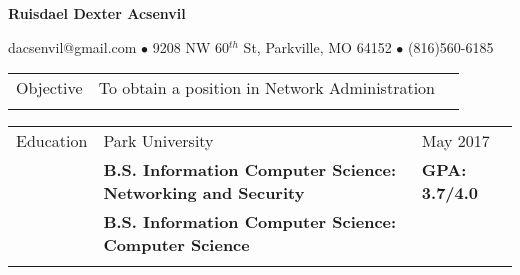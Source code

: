 \documentclass[12pt, arial]{article}
\begin{document}

\centerline{\textbf{Ruisdael Dexter Acsenvil}}
\centerline{ dacsenvil@gmail.com    $\bullet$    9208 NW 60$^{th}$ St, Parkville, MO 64152    $\bullet$    (816)560-6185}

\begin{tabular}{p{1.9cm} p{12.9cm} r}
\\
Objective  	& To obtain a position in Network Administration 					& 						\\ \\
\end{tabular}

\begin{tabular}{p{1.9cm} p{12.9cm} l}
Education  	& Park University													& May 2017 				\\
			& \textbf{B.S. Information Computer Science: Networking and Security} & \textbf{GPA: 3.7/4.0} \\
			& \textbf{B.S. Information Computer Science: Computer Science} 		&						\\ \\
\end{tabular}
\end{document}
